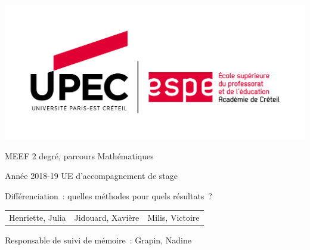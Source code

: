 \begin{titlepage}
    \begin{center}
        \includegraphics[scale=0.5]{logo_UPEC_ESPE.png}

        MEEF 2 degré, parcours Mathématiques

        Année 2018-19 UE d'accompagnement de stage

        \vspace*{\fill}

        \Huge{Différenciation : quelles méthodes pour quels résultats ?}

        \vspace*{\fill}

        \begin{tabular}{ccc}
            \Large{Henriette, Julia}&\Large{Jidouard, Xavière}&\Large{Milis, Victoire}
        \end{tabular}

        \vspace*{\fill}

        \Large{Responsable de suivi de mémoire : Grapin, Nadine}

        \vspace*{\fill}
    \end{center}
\end{titlepage}
